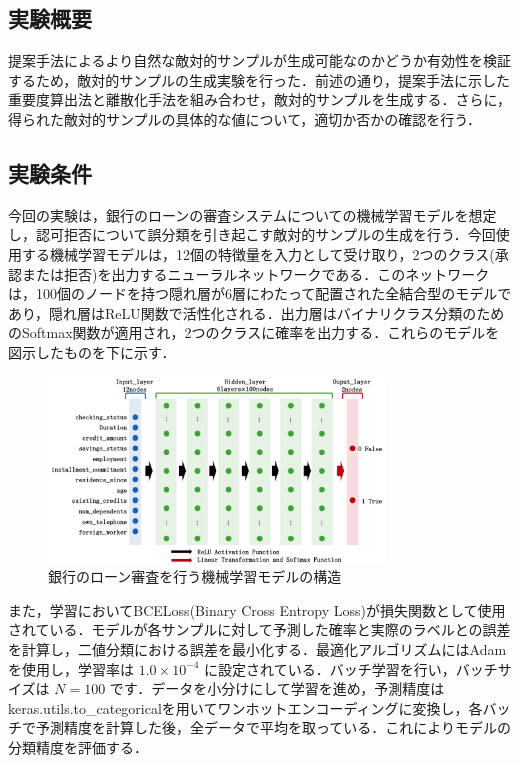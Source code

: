 \subsection{実験概要}
提案手法によるより自然な敵対的サンプルが生成可能なのかどうか有効性を検証するため，敵対的サンプルの生成実験を行った．前述の通り，提案手法に示した重要度算出法と離散化手法を組み合わせ，敵対的サンプルを生成する．さらに，得られた敵対的サンプルの具体的な値について，適切か否かの確認を行う．
\subsection{実験条件}
今回の実験は，銀行のローンの審査システムについての機械学習モデルを想定し，認可拒否について誤分類を引き起こす敵対的サンプルの生成を行う．今回使用する機械学習モデルは，12個の特徴量を入力として受け取り，2つのクラス(承認または拒否)を出力するニューラルネットワークである．このネットワークは，100個のノードを持つ隠れ層が6層にわたって配置された全結合型のモデルであり，隠れ層はReLU関数で活性化される．出力層はバイナリクラス分類のためのSoftmax関数が適用され，2つのクラスに確率を出力する．これらのモデルを図示したものを下に示す．

\begin{figure}[H]
    \centering
    \includegraphics[width=0.8\textwidth]{images/審査モデル.png}
    \caption{銀行のローン審査を行う機械学習モデルの構造}
    \label{fig:adversarial_example}
\end{figure}

また，学習においてBCELoss(Binary Cross Entropy Loss)が損失関数として使用されている．モデルが各サンプルに対して予測した確率と実際のラベルとの誤差を計算し，二値分類における誤差を最小化する．最適化アルゴリズムにはAdamを使用し，学習率は $1.0 \times 10^{-4}$ に設定されている．バッチ学習を行い，バッチサイズは $N=100$ です．データを小分けにして学習を進め，予測精度はkeras.utils.to\_categoricalを用いてワンホットエンコーディングに変換し，各バッチで予測精度を計算した後，全データで平均を取っている．これによりモデルの分類精度を評価する．

